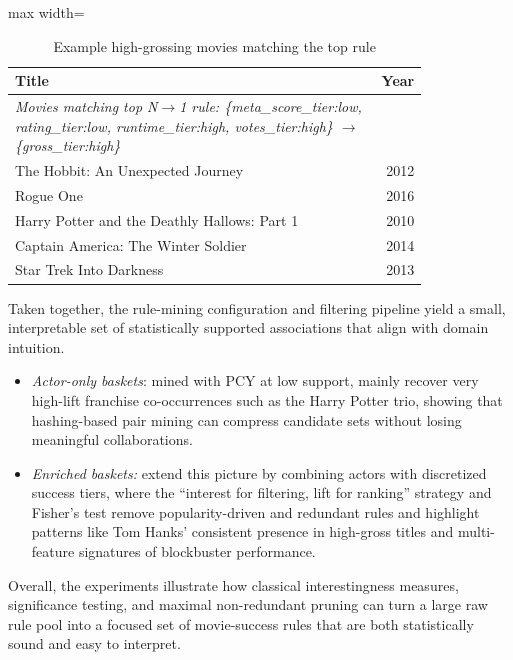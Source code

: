 \documentclass{article}  %
\begin{document}
\begin{table}[!htbp]
    \vspace{0.3em}

    \begin{subtable}{\linewidth}
        \centering
        \caption{Example high-grossing movies matching the top rule}
        \begin{adjustbox}{max width=\linewidth}
        \begin{tabular}{p{0.82\linewidth} r}
            \toprule
            \textbf{Title} & \textbf{Year} \\
            \midrule
            \multicolumn{2}{p{0.97\linewidth}}{\textit{Movies matching top N$\rightarrow$1 rule:
            \{meta\_score\_tier:low, rating\_tier:low, runtime\_tier:high, votes\_tier:high\}
            \(\rightarrow\) \{gross\_tier:high\}}} \\
            \addlinespace[0.3em]
            The Hobbit: An Unexpected Journey & 2012 \\
            Rogue One & 2016 \\
            Harry Potter and the Deathly Hallows: Part 1 & 2010 \\
            Captain America: The Winter Soldier & 2014 \\
            Star Trek Into Darkness & 2013 \\
            \bottomrule
        \end{tabular}
        \end{adjustbox}
    \end{subtable}

    \label{tab:25top_ng1_gross_high_with_subtables}
\end{table}


\FloatBarrier
Taken together, the rule-mining configuration and filtering pipeline yield a small, interpretable set of statistically supported associations that align with domain intuition. 

\begin{itemize}
    \item     \textit{Actor-only baskets}:  mined with PCY at low support, mainly recover very high-lift franchise co-occurrences such as the Harry Potter trio, showing that hashing-based pair mining can compress candidate sets without losing meaningful collaborations.
    \item     \textit{Enriched baskets:} extend this picture by combining actors with discretized success tiers, where the “interest for filtering, lift for ranking” strategy and Fisher’s test remove popularity-driven and redundant rules and highlight patterns like Tom Hanks’ consistent presence in high-gross titles and multi-feature signatures of blockbuster performance.

\end{itemize}
Overall, the experiments illustrate how classical interestingness measures, significance testing, and maximal non-redundant pruning can turn a large raw rule pool into a focused set of movie-success rules that are both statistically sound and easy to interpret.
\end{document}
